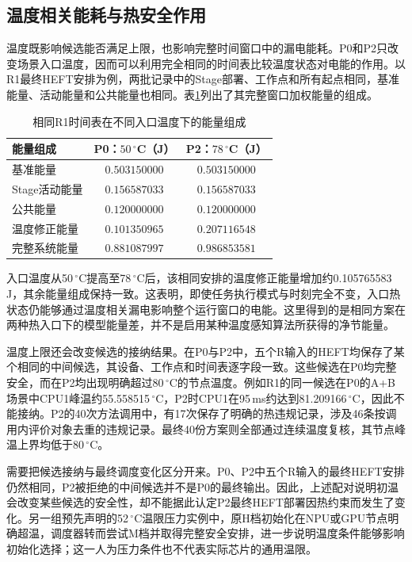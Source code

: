 
\subsection{温度相关能耗与热安全作用}

温度既影响候选能否满足上限，也影响完整时间窗口中的漏电能耗。P0和P2只改变场景入口温度，因而可以利用完全相同的时间表比较温度状态对电能的作用。以R1最终HEFT安排为例，两批记录中的Stage部署、工作点和所有起点相同，基准能量、活动能量和公共能量也相同。表\ref{tab:c3-temp-energy}列出了其完整窗口加权能量的组成。

\begin{table}[htbp]
 \centering
 \caption{相同R1时间表在不同入口温度下的能量组成}
 \label{tab:c3-temp-energy}
 \begin{tabular}{lcc}
 \toprule
 能量组成 & P0：$50\,^\circ$C（J） & P2：$78\,^\circ$C（J）\\
 \midrule
 基准能量 & $0.503150000$ & $0.503150000$\\
 Stage活动能量 & $0.156587033$ & $0.156587033$\\
 公共能量 & $0.120000000$ & $0.120000000$\\
 温度修正能量 & $0.101350965$ & $0.207116548$\\
 \midrule
 完整系统能量 & $0.881087997$ & $0.986853581$\\
 \bottomrule
 \end{tabular}
\end{table}

入口温度从50\,$^\circ$C提高至78\,$^\circ$C后，该相同安排的温度修正能量增加约0.105765583\,J，其余能量组成保持一致。这表明，即使任务执行模式与时刻完全不变，入口热状态仍能够通过温度相关漏电影响整个运行窗口的电能。这里得到的是相同方案在两种热入口下的模型能量差，并不是启用某种温度感知算法所获得的净节能量。

温度上限还会改变候选的接纳结果。在P0与P2中，五个R输入的HEFT均保存了某个相同的中间候选，其设备、工作点和时间表逐字段一致。这些候选在P0均完整安全，而在P2均出现明确超过80\,$^\circ$C的节点温度。例如R1的同一候选在P0的A+B场景中CPU1峰温约55.558515\,$^\circ$C，P2时CPU1在95\,ms约达到81.209166\,$^\circ$C，因此不能接纳。P2的40次方法调用中，有17次保存了明确的热违规记录，涉及46条按调用内评价对象去重的违规记录。最终40份方案则全部通过连续温度复核，其节点峰温上界均低于80\,$^\circ$C。

需要把候选接纳与最终调度变化区分开来。P0、P2中五个R输入的最终HEFT安排仍然相同，P2被拒绝的中间候选并不是P0的最终输出。因此，上述配对说明初温会改变某些候选的安全性，却不能据此认定P2最终HEFT部署因热约束而发生了变化。另一组预先声明的52\,$^\circ$C温限压力实例中，原H档初始化在NPU或GPU节点明确超温，调度器转而尝试M档并取得完整安全安排，进一步说明温度条件能够影响初始化选择；这一人为压力条件也不代表实际芯片的通用温限。

